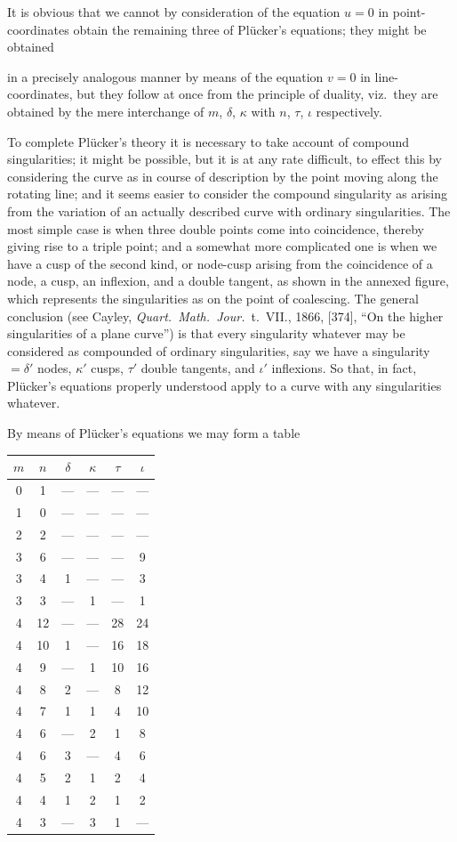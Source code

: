 \documentclass[12pt,a4paper,oneside]{book}
\begin{document}
It is obvious that we cannot by consideration of the equation $u=0$ in point-coordinates obtain the remaining three of Pl\"ucker's equations; they might be obtained

\newpage
in a precisely analogous manner by means of the equation $v=0$ in line-coordinates, but they follow at once from the principle of duality, viz.\ they are obtained by the mere interchange of $m$, $\delta$, $\kappa$ with $n$, $\tau$, $\iota$ respectively.

To complete Pl\"ucker's theory it is necessary to take account of compound singularities; it might be possible, but it is at any rate difficult, to effect this by considering the curve as in course of description by the point moving along the rotating line; and it seems easier to consider the compound singularity as arising from the variation of an actually described curve with ordinary singularities. The most simple case is when three double points come into coincidence, thereby giving rise to a triple point; and a somewhat more complicated one is when we have a cusp of the second kind, or node-cusp arising from the coincidence of a node, a cusp, an inflexion, and a double tangent, as shown in the annexed figure, which represents the singularities as on the point of coalescing. The general conclusion (see Cayley, \textit{Quart.\ Math.\ Jour.}\ t.~VII., 1866, [374], ``On the higher singularities of a plane curve'') is that every singularity whatever may be considered as compounded of ordinary singularities, say we have a singularity $=\delta'$ nodes, $\kappa'$ cusps, $\tau'$ double tangents, and $\iota'$ inflexions. So that, in fact, Pl\"ucker's equations properly understood apply to a curve with any singularities whatever.

By means of Pl\"ucker's equations we may form a table
\begin{center}
\begin{tabular}{cccccc}
$m$ & $n$ & $\delta$ & $\kappa$ & $\tau$ & $\iota$ \\
\hline
0 & 1 & --- & --- & --- & --- \\
1 & 0 & --- & --- & --- & --- \\
2 & 2 & --- & --- & --- & --- \\
3 & 6 & --- & --- & --- & 9 \\
3 & 4 & 1 & --- & --- & 3 \\
3 & 3 & --- & 1 & --- & 1 \\[3pt]
4 & 12 & --- & --- & 28 & 24 \\
4 & 10 & 1 & --- & 16 & 18 \\
4 & 9  & --- & 1  & 10 & 16 \\
4 & 8  & 2 & --- & 8  & 12 \\
4 & 7  & 1 & 1   & 4  & 10 \\
4 & 6  & --- & 2 & 1  & 8  \\
4 & 6  & 3 & --- & 4  & 6  \\
4 & 5  & 2 & 1   & 2  & 4  \\
4 & 4  & 1 & 2   & 1  & 2  \\
4 & 3  & --- & 3 & 1  & --- \\
\end{tabular}
\end{center}
\end{document}
